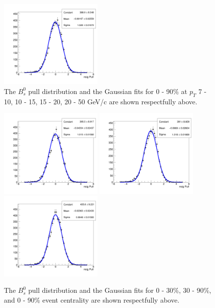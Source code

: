 \begin{figure}[h]
\begin{center}
\includegraphics[width= 0.45\textwidth]{Figures/Chapter4/pull_signal_BptNew_0_90_20_50_0_Bs.png}
\caption{The $B^0_s$ pull distribution and the Gaussian fits for 0 - 90\% at $p_T$ 7 - 10, 10 - 15, 15 - 20, 20 - 50 GeV/c are shown respectfully above.} 
\label{BsPtPull} 
\end{center}
\end{figure}

\begin{figure}[h]
\begin{center}
\includegraphics[width= 0.45\textwidth]{Figures/Chapter4/pull_signal_BptNew_0_30_10_50_0_Bs.png}
\includegraphics[width= 0.45\textwidth]{Figures/Chapter4/pull_signal_BptNew_30_90_10_50_0_Bs.png}
\includegraphics[width= 0.45\textwidth]{Figures/Chapter4/pull_signal_BptNew_0_90_10_50_0_Bs.png}
\caption{The $B^0_s$ pull distribution and the Gaussian fits for 0 - 30\%, 30 - 90\%, and 0 - 90\% event centrality are shown respectfully above.} 
\label{BsCentPull} 
\end{center}
\end{figure}


